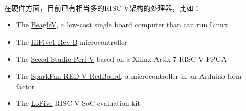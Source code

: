 \documentclass[UTF8,fontset=none,linespread=1.15]{ctexart}
\let\nosupcite\cite
\renewcommand*{\cite}[1]{\textsuperscript{\nosupcite{#1}}}
\begin{document}
在硬件方面，目前已有相当多的RISC-V架构的处理器，比如：\cite{bib:riscv-support}
\begin{itemize}
\item The \href{https://beagleboard.org/beaglev}{BeagleV}, a low-cost single board computer than can run Linux
\item The \href{https://www.sifive.com/boards/hifive1-rev-b}{HiFive1 Rev B} microcontroller
\item The \href{https://www.seeedstudio.com/Perf-V-Based-on-Xilinx-Artix-7-FPGA-RISC-V-opensource-p-4058.html}{Seeed Studio Perf-V} based on a Xilinx Artix-7 RISC-V FPGA
\item The \href{https://www.sparkfun.com/products/15594}{SparkFun RED-V RedBoard}, a microcontroller in an Arduino form factor
\item The \href{https://www.digikey.ca/en/products/detail/groupgets-llc/LOFIVE-R1/10186935}{LoFive} RISC-V SoC evaluation kit
\end{itemize}
\end{document}

